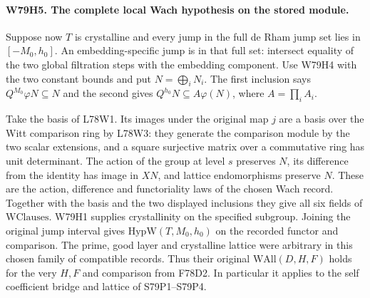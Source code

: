 \paragraph{W79H5. The complete local Wach hypothesis on the stored module.}
Suppose now $T$ is crystalline and every jump in the full de Rham
jump set lies in $[-M_0,h_0]$. An embedding-specific jump is in
that full set: intersect equality of the two global filtration
steps with the embedding component. Use W79H4 with the two
constant bounds and put $N=\bigoplus_i N_i$. The first inclusion
says $Q^{M_0}\varphi N\subseteq N$ and the second gives
$Q^{h_0}N\subseteq A\varphi(N)$, where $A=\prod_i A_i$.

Take the basis of L78W1. Its images under the original map $j$
are a basis over the Witt comparison ring by L78W3: they generate
the comparison module by the two scalar extensions, and a square
surjective matrix over a commutative ring has unit determinant.
The action of the group at level $s$ preserves $N$, its difference
from the identity has image in $XN$, and lattice endomorphisms
preserve $N$. These are the action, difference and functoriality
laws of the chosen Wach record. Together with the basis and the
two displayed inclusions they give all six fields of
$\mathrm{WClauses}$. W79H1 supplies crystallinity on the specified
subgroup. Joining the original jump interval gives
$\mathrm{HypW}(T,M_0,h_0)$ on the recorded functor and comparison.
The prime, good layer and crystalline lattice were arbitrary in
this chosen family of compatible records. Thus their original
$\mathrm{WAll}(D,H,F)$ holds for the very $H,F$ and comparison
from F78D2. In particular it applies to the self coefficient
bridge and lattice of S79P1--S79P4.
